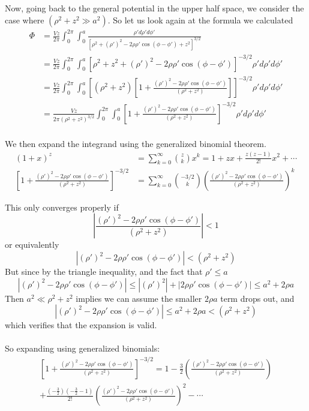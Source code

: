 \documentclass{article}
\begin{document}
Now, going back to the general potential in the upper half space, we consider the case where $(\rho^{2}+z^{2}\gg a^{2})$. So let us look again at the formula we calculated
\begin{align*}
\Phi &= \frac{Vz}{2\pi} \int_{0}^{2\pi}\int_{0}^{a} \frac{\rho' d\rho'd\phi'}{[\rho^{2} + (\rho')^{2} - 2\rho\rho'\cos(\phi-\phi') + z^{2}]^{3/2}}\\
&= \frac{Vz}{2\pi} \int_{0}^{2\pi}\int_{0}^{a} \left[\rho^{2} + z^{2} + (\rho')^{2} - 2\rho\rho'\cos(\phi-\phi')\right]^{-3/2}\rho' d\rho'd\phi'\\
&= \frac{Vz}{2\pi} \int_{0}^{2\pi}\int_{0}^{a} \left[(\rho^{2} + z^{2})\left[1 + \frac{(\rho')^{2} - 2\rho\rho'\cos(\phi-\phi')}{(\rho^{2} + z^{2})}\right]\right]^{-3/2}\rho' d\rho'd\phi'\\
&= \frac{Vz}{2\pi(\rho^{2} + z^{2})^{3/2}} \int_{0}^{2\pi}\int_{0}^{a} \left[1 + \frac{(\rho')^{2} - 2\rho\rho'\cos(\phi-\phi')}{(\rho^{2} + z^{2})}\right]^{-3/2}\rho' d\rho'd\phi'\\
\end{align*}

We then expand the integrand using the generalized binomial theorem.
\begin{align*}
(1+x)^{z} &= \sum_{k=0}^{\infty} {z\choose k} x^{k} = 1 + zx + \frac{z(z-1)}{2!}x^{2} + \cdots\\
\left[1 + \frac{(\rho')^{2} - 2\rho\rho'\cos(\phi-\phi')}{(\rho^{2} + z^{2})} \right]^{-3/2} &= \sum_{k=0}^{\infty} {-3/2\choose k} \left( \frac{(\rho')^{2} - 2\rho\rho'\cos(\phi-\phi')}{(\rho^{2} + z^{2})} \right)^{k}
\end{align*}

This only converges properly if 
\[ \left| \frac{(\rho')^{2} - 2\rho\rho'\cos(\phi-\phi')}{(\rho^{2} + z^{2})} \right| < 1 \]
or equivalently
\[ \left| (\rho')^{2} - 2\rho\rho'\cos(\phi-\phi') \right| < (\rho^{2} + z^{2}) \]
But since by the triangle inequality, and the fact that $\rho'\le a$
\[ \left| (\rho')^{2} - 2\rho\rho'\cos(\phi-\phi') \right| \le \left| (\rho')^{2} \right| + \left| 2\rho\rho'\cos(\phi-\phi') \right| \le a^{2} + 2\rho a\]
Then $a^{2} \ll \rho^{2} + z^{2}$ implies we can assume the smaller $2\rho a$ term drops out, and
\[ \left| (\rho')^{2} - 2\rho\rho'\cos(\phi-\phi') \right| \le a^{2} + 2\rho a < (\rho^{2} + z^{2}) \]
which verifies that the expansion is valid.\\
\\
So expanding using generalized binomials:
\begin{multline*} 
\left[1 + \frac{(\rho')^{2} - 2\rho\rho'\cos(\phi-\phi')}{(\rho^{2} + z^{2})}\right]^{-3/2} = 1 - \frac{3}{2}\left( \frac{(\rho')^{2} - 2\rho\rho'\cos(\phi-\phi')}{(\rho^{2} + z^{2})} \right)\\
+ \frac{(-\frac{3}{2})(-\frac{3}{2}-1)}{2!}\left( \frac{(\rho')^{2} - 2\rho\rho'\cos(\phi-\phi')}{(\rho^{2} + z^{2})} \right)^{2} - \cdots \end{multline*}
\end{document}
